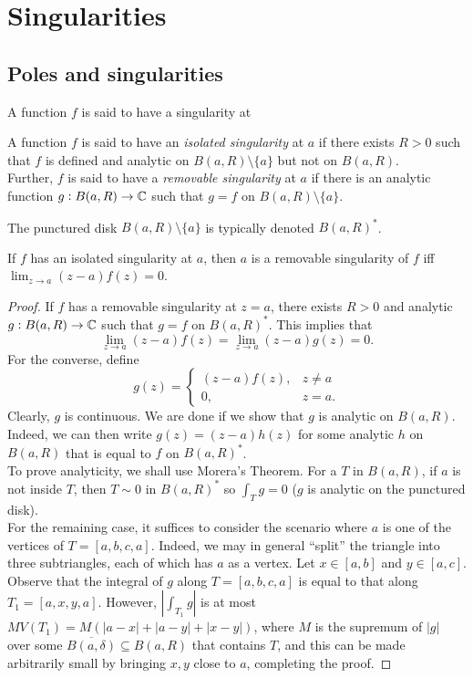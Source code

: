 \section{Singularities}

\subsection{Poles and singularities}

	A function $f$ is said to have a singularity at 

	\begin{fdef}
		A function $f$ is said to have an \emph{isolated singularity} at $a$ if there exists $R > 0$ such that $f$ is defined and analytic on $B(a,R) \setminus \{a\}$ but not on $B(a,R)$.\\
		Further, $f$ is said to have a \emph{removable singularity} at $a$ if there is an analytic function $g : B(a,R) \to \mathbb{C}$ such that $g = f$ on $B(a,R) \setminus \{a\}$.
	\end{fdef}

	The punctured disk $B(a,R) \setminus \{a\}$ is typically denoted $B(a,R)^*$.

	\begin{ftheo}
		\label{theo 4.1}
		If $f$ has an isolated singularity at $a$, then $a$ is a removable singularity of $f$ iff $\lim_{z \to a} (z-a) f(z) = 0$.
	\end{ftheo}
	\begin{proof}
		If $f$ has a removable singularity at $z = a$, there exists $R > 0$ and analytic $g : B(a,R) \to \mathbb{C}$ such that $g = f$ on $B(a,R)^*$. This implies that
		\[ \lim_{z\to a} (z-a) f(z) = \lim_{z \to a} (z-a) g(z) = 0. \]
		For the converse, define
		\[ g(z) =
		\begin{cases}
			(z-a) f(z), & z \ne a \\
			0, & z=a.	
		\end{cases}
		\]
		Clearly, $g$ is continuous. We are done if we show that $g$ is analytic on $B(a,R)$. Indeed, we can then write $g(z) = (z-a) h(z)$ for some analytic $h$ on $B(a,R)$ that is equal to $f$ on $B(a,R)^*$.\\
		To prove analyticity, we shall use Morera's Theorem. For a $T$ in $B(a,R)$, if $a$ is not inside $T$, then $T \sim 0$ in $B(a,R)^*$ so $\int_T g = 0$ ($g$ is analytic on the punctured disk).\\
		For the remaining case, it suffices to consider the scenario where $a$ is one of the vertices of $T = [a,b,c,a]$. Indeed, we may in general ``split'' the triangle into three subtriangles, each of which has $a$ as a vertex. Let $x \in [a,b]$ and $y \in [a,c]$. Observe that the integral of $g$ along $T = [a,b,c,a]$ is equal to that along $T_1 = [a,x,y,a]$. However, $\left| \int_{T_1} g \right|$ is at most $M V(T_1) = M (|a-x| + |a-y| + |x-y|)$, where $M$ is the supremum of $|g|$ over some $\overline{B(a,\delta)} \subseteq B(a,R)$ that contains $T$, and this can be made arbitrarily small by bringing $x,y$ close to $a$, completing the proof.
	\end{proof}

